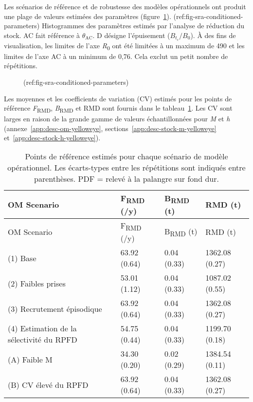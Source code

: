 \documentclass[11pt]{book}
\begin{document}
Les scénarios de référence et de robustesse des modèles opérationnels ont produit une plage de valeurs estimées des paramètres (figure~\ref{fig:sra-conditioned-parameters}). (ref:fig-sra-conditioned-parameters) Histogrammes des paramètres estimés par l'analyse de réduction du stock. AC fait référence à \(\theta_\textrm{AC}\). D désigne l'épuisement (\(B_{t_c}/B_0\)). À des fins de visualisation, les limites de l'axe \emph{R}\textsubscript{0} ont été limitées à un maximum de 490 et les limites de l'axe AC à un minimum de 0,76. Cela exclut un petit nombre de répétitions.
\begin{figure}[htb]

{\centering {} 

}

\caption{(ref:fig-sra-conditioned-parameters)}\label{fig:sra-conditioned-parameters}
\end{figure}
Les moyennes et les coefficients de variation (CV) estimés pour les points de référence \emph{F}\textsubscript{RMD}, \emph{B}\textsubscript{RMD} et RMD sont fournis dans le tableau~\ref{tab:sra-ref-pts}. Les CV sont larges en raison de la grande gamme de valeurs échantillonnées pour \emph{M} et \emph{h} (annexe~\ref{app:desc-om-yelloweye}, sections~\ref{app:desc-stock-m-yelloweye} et~\ref{app:desc-stock-h-yelloweye}).
\begin{longtable}[]{@{}llll@{}}
\caption{\label{tab:sra-ref-pts}Points de référence estimés pour chaque scénario de modèle opérationnel. Les écarts-types entre les répétitions sont indiqués entre parenthèses. PDF = relevé à la palangre sur fond dur.}\tabularnewline
\toprule
OM Scenario & F\textsubscript{RMD} (/y) & B\textsubscript{RMD} (t) & RMD (t) \\
\midrule
\endfirsthead
\toprule
OM Scenario & F\textsubscript{RMD} (/y) & B\textsubscript{RMD} (t) & RMD (t) \\
\midrule
\endhead
(1) Base & 63.92 (0.64) & 0.04 (0.33) & 1362.08 (0.27) \\
(2) Faibles prises & 53.01 (1.12) & 0.04 (0.33) & 1087.02 (0.55) \\
(3) Recrutement épisodique & 63.92 (0.64) & 0.04 (0.33) & 1362.08 (0.27) \\
(4) Estimation de la sélectivité du RPFD & 54.75 (0.44) & 0.04 (0.33) & 1199.70 (0.18) \\
(A) Faible M & 34.30 (0.20) & 0.02 (0.29) & 1384.54 (0.11) \\
(B) CV élevé du RPFD & 63.92 (0.64) & 0.04 (0.33) & 1362.08 (0.27) \\
\bottomrule
\end{longtable}
\clearpage
\end{document}
